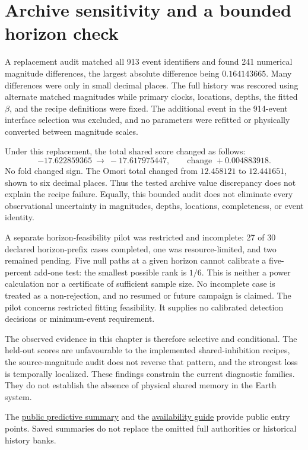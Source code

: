 \section{Archive sensitivity and a bounded horizon check}

A replacement audit matched all 913 event identifiers and found 241 numerical magnitude differences, the largest absolute difference being \(0.164143665\). Many differences were only in small decimal places. The full history was rescored using alternate matched magnitudes while primary clocks, locations, depths, the fitted \(\beta\), and the recipe definitions were fixed. The additional event in the 914-event interface selection was excluded, and no parameters were refitted or physically converted between magnitude scales.

Under this replacement, the total shared score changed as follows:
\[
 -17.622859365\ \longrightarrow\ -17.617975447,
 \qquad \text{change }+0.004883918.
\]
No fold changed sign. The Omori total changed from \(12.458121\) to \(12.441651\), shown to six decimal places. Thus the tested archive value discrepancy does not explain the recipe failure. Equally, this bounded audit does not eliminate every observational uncertainty in magnitudes, depths, locations, completeness, or event identity.

A separate horizon-feasibility pilot was restricted and incomplete: 27 of 30 declared horizon-prefix cases completed, one was resource-limited, and two remained pending. Five null paths at a given horizon cannot calibrate a five-percent add-one test: the smallest possible rank is \(1/6\). This is neither a power calculation nor a certificate of sufficient sample size. No incomplete case is treated as a non-rejection, and no resumed or future campaign is claimed. The pilot concerns restricted fitting feasibility. It supplies no calibrated detection decisions or minimum-event requirement.

The observed evidence in this chapter is therefore selective and conditional. The held-out scores are unfavourable to the implemented shared-inhibition recipes, the source-magnitude audit does not reverse that pattern, and the strongest loss is temporally localized. These findings constrain the current diagnostic families. They do not establish the absence of physical shared memory in the Earth system.

The \href{https://github.com/Drefetr/InhibitoryEarthquakeModels/blob/3e76a174cf4f58ce601c6c9640c4d0c11168813f/paper/data/prediction.json}{public predictive summary} and the \hyperref[sec:source-supplements]{availability guide} provide public entry points. Saved summaries do not replace the omitted full authorities or historical history banks.
